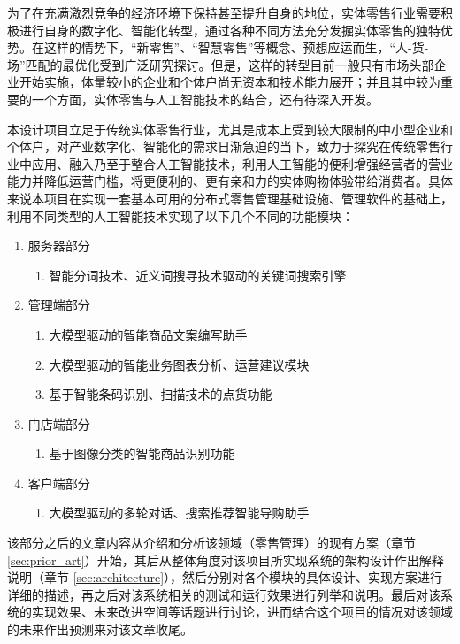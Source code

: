 为了在充满激烈竞争的经济环境下保持甚至提升自身的地位，实体零售行业需要积极进行自身的数字化、智能化转型，通过各种不同方法充分发掘实体零售的独特优势。在这样的情势下，“新零售”\cite{zhao2017new_retail,du2017new_retail}、“智慧零售”\cite{liao2019intelligent_retail}等概念、预想应运而生，“人-货-场”匹配的最优化\cite{wang2018person_good_place}受到广泛研究探讨。但是，这样的转型目前一般只有市场头部企业开始实施，体量较小的企业和个体户尚无资本和技术能力展开；并且其中较为重要的一个方面，实体零售与人工智能技术的结合，还有待深入开发。

本设计项目立足于传统实体零售行业，尤其是成本上受到较大限制的中小型企业和个体户，对产业数字化、智能化的需求日渐急迫的当下，致力于探究在传统零售行业中应用、融入乃至于整合人工智能技术，利用人工智能的便利增强经营者的营业能力并降低运营门槛，将更便利的、更有亲和力的实体购物体验带给消费者。具体来说本项目在实现一套基本可用的分布式零售管理基础设施、管理软件的基础上，利用不同类型的人工智能技术实现了以下几个不同的功能模块：

\begin{enumerate}
    \item 服务器部分
    \begin{enumerate}
        \item 智能分词技术、近义词搜寻技术驱动的关键词搜索引擎
    \end{enumerate}
    \item 管理端部分
    \begin{enumerate}
        \item 大模型驱动的智能商品文案编写助手
        \item 大模型驱动的智能业务图表分析、运营建议模块
        \item 基于智能条码识别、扫描技术的点货功能
    \end{enumerate}
    \item 门店端部分
    \begin{enumerate}
        \item 基于图像分类的智能商品识别功能
    \end{enumerate}
    \item 客户端部分
    \begin{enumerate}
        \item 大模型驱动的多轮对话、搜索推荐智能导购助手
    \end{enumerate}
\end{enumerate}

该部分之后的文章内容从介绍和分析该领域（零售管理）的现有方案（章节 \ref{sec:prior_art}）开始，其后从整体角度对该项目所实现系统的架构设计作出解释说明（章节 \ref{sec:architecture}），然后分别对各个模块的具体设计、实现方案进行详细的描述，再之后对该系统相关的测试和运行效果进行列举和说明。最后对该系统的实现效果、未来改进空间等话题进行讨论，进而结合这个项目的情况对该领域的未来作出预测来对该文章收尾。